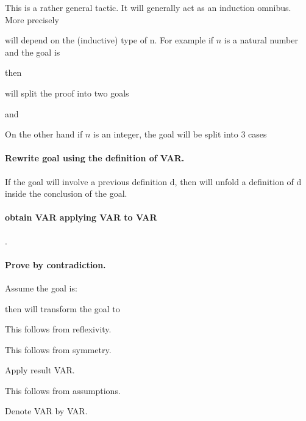 This is a rather general tactic. It will generally act as an induction omnibus. More precisely

will depend on the (inductive) type of n. For example if $n$ is a natural number and the goal is

 then 

will split the proof into two goals
 
 and 
 
On the other hand if $n$ is an integer, the goal
will be split into 3 cases

 
 

\paragraph{\bf Rewrite goal using the definition of VAR.}
If the goal will involve a previous definition d, then
 will unfold a definition of d inside the conclusion of the goal.


\paragraph{\bf obtain VAR applying VAR to VAR}.

\paragraph{\bf Prove by contradiction.}

Assume the goal is:

 
 then  
  will transform the goal to
 


This follows from reflexivity.


This follows from symmetry.


Apply result VAR.


This follows from assumptions.

Denote VAR by VAR.